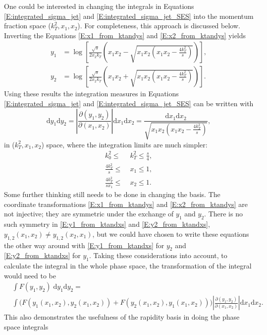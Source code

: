 \documentclass[a4paper, twoside, english, 12pt]{report}
\begin{document}
One could be interested in changing the integrals in Equations \eqref{E:integrated_sigma_jet} and \eqref{E:integrated_sigma_jet_SES} into the momentum fraction space ($k_T^2,x_1,x_2$). For completeness, this approach is discussed below. Inverting the Equations \eqref{E:x1_from_ktandys} and \eqref{E:x2_from_ktandys} yields
\begin{align}
y_1 &= \log\left[\frac{\sqrt{s}}{2x_2k_T}\left(x_1x_2-\sqrt{x_1x_2\left(x_1x_2-\frac{4k_T^2}{s}\right)}\right)\right] \label{E:y1_from_ktandxs} ,\\[1em]
y_2 &= \log\left[\frac{\sqrt{s}}{2x_2k_T}\left(x_1x_2+\sqrt{x_1x_2\left(x_1x_2-\frac{4k_T^2}{s}\right)}\right)\right] \label{E:y2_from_ktandxs} . 
\end{align}
Using these results the integration measures in Equations \eqref{E:integrated_sigma_jet} and \eqref{E:integrated_sigma_jet_SES} can be written with
\begin{equation}\label{E:integration_measure_transform}
\text{d}y_1\text{d}y_2 = \left|\frac{\partial(y_1,y_2)}{\partial(x_1,x_2)}\right|\text{d}x_1\text{d}x_2 = \frac{\text{d}x_1\text{d}x_2}{\sqrt{x_1x_2\left(x_1x_2-\frac{4k_T^2}{s}\right)}},
\end{equation}
in ($k_T^2,x_1,x_2$) space, where the integration limits are much simpler:
\begin{align}
k_0^2\leq\; &k_T^2 \leq \frac{s}{4} , \\
\frac{4k_T^2}{s} \leq\; &x_1 \leq 1 ,\\
\frac{4k_T^2}{sx_1} \leq\; &x_2 \leq 1 .
\end{align}
Some further thinking still needs to be done in changing the basis. The coordinate transformations \eqref{E:x1_from_ktandys} and \eqref{E:x2_from_ktandys} are not injective; they are symmetric under the exchange of $y_1$ and $y_2$. There is no such symmetry in \eqref{E:y1_from_ktandxs} and \eqref{E:y2_from_ktandxs}, $y_{1,2}(x_1,x_2)\neq y_{1,2}(x_2,x_1)$, but we could have chosen to write these equations the other way around with \eqref{E:y1_from_ktandxs} for $y_2$ and \eqref{E:y2_from_ktandxs} for $y_1$. Taking these considerations into account, to calculate the integral in the whole phase space, the transformation of the integral would need to be
\begin{align}
&\int F(y_1,y_2)\;\text{d}y_1\text{d}y_2  = \nonumber\\ &\int \Big(F(y_1(x_1,x_2),y_2(x_1,x_2))+F(y_2(x_1,x_2),y_1(x_1,x_2))\Big)\left|\frac{\partial(y_1,y_2)}{\partial(x_1,x_2)}\right|\text{d}x_1\text{d}x_2 .
\end{align}
This also demonstrates the usefulness of the rapidity basis in doing the phase space integrals
\end{document}
